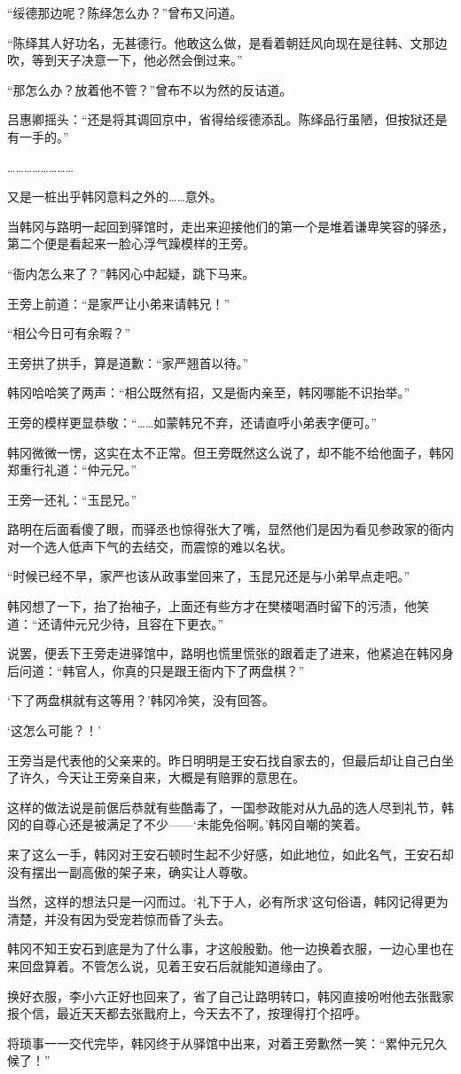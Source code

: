 “绥德那边呢？陈绎怎么办？”曾布又问道。

“陈绎其人好功名，无甚德行。他敢这么做，是看着朝廷风向现在是往韩、文那边吹，等到天子决意一下，他必然会倒过来。”

“那怎么办？放着他不管？”曾布不以为然的反诘道。

吕惠卿摇头：“还是将其调回京中，省得给绥德添乱。陈绎品行虽陋，但按狱还是有一手的。”

……………………

又是一桩出乎韩冈意料之外的……意外。

当韩冈与路明一起回到驿馆时，走出来迎接他们的第一个是堆着谦卑笑容的驿丞，第二个便是看起来一脸心浮气躁模样的王旁。

“衙内怎么来了？”韩冈心中起疑，跳下马来。

王旁上前道：“是家严让小弟来请韩兄！”

“相公今日可有余暇？”

王旁拱了拱手，算是道歉：“家严翘首以待。”

韩冈哈哈笑了两声：“相公既然有招，又是衙内亲至，韩冈哪能不识抬举。”

王旁的模样更显恭敬：“……如蒙韩兄不弃，还请直呼小弟表字便可。”

韩冈微微一愣，这实在太不正常。但王旁既然这么说了，却不能不给他面子，韩冈郑重行礼道：“仲元兄。”

王旁一还礼：“玉昆兄。”

路明在后面看傻了眼，而驿丞也惊得张大了嘴，显然他们是因为看见参政家的衙内对一个选人低声下气的去结交，而震惊的难以名状。

“时候已经不早，家严也该从政事堂回来了，玉昆兄还是与小弟早点走吧。”

韩冈想了一下，抬了抬袖子，上面还有些方才在樊楼喝酒时留下的污渍，他笑道：“还请仲元兄少待，且容在下更衣。”

说罢，便丢下王旁走进驿馆中，路明也慌里慌张的跟着走了进来，他紧追在韩冈身后问道：“韩官人，你真的只是跟王衙内下了两盘棋？”

‘下了两盘棋就有这等用？’韩冈冷笑，没有回答。

‘这怎么可能？！’

王旁当是代表他的父亲来的。昨日明明是王安石找自家去的，但最后却让自己白坐了许久，今天让王旁亲自来，大概是有赔罪的意思在。

这样的做法说是前倨后恭就有些酷毒了，一国参政能对从九品的选人尽到礼节，韩冈的自尊心还是被满足了不少——‘未能免俗啊。’韩冈自嘲的笑着。

来了这么一手，韩冈对王安石顿时生起不少好感，如此地位，如此名气，王安石却没有摆出一副高傲的架子来，确实让人尊敬。

当然，这样的想法只是一闪而过。‘礼下于人，必有所求’这句俗语，韩冈记得更为清楚，并没有因为受宠若惊而昏了头去。

韩冈不知王安石到底是为了什么事，才这般殷勤。他一边换着衣服，一边心里也在来回盘算着。不管怎么说，见着王安石后就能知道缘由了。

换好衣服，李小六正好也回来了，省了自己让路明转口，韩冈直接吩咐他去张戬家报个信，最近天天都去张戬府上，今天去不了，按理得打个招呼。

将琐事一一交代完毕，韩冈终于从驿馆中出来，对着王旁歉然一笑：“累仲元兄久候了！”

